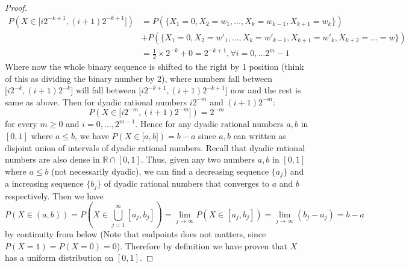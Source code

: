 \documentclass[10pt]{article}
\begin{document}
\begin{proof}
\begin{equation}
\begin{split}
P(X \in \big[i2^{-k+1}, (i+1)2^{-k+1}\big]) &= P(\{X_{1}= 0, X_{2}= w_{1},...,X_{k}= w_{k-1}, X_{k+1}= w_{k}\}) \\
& + P(\{X_{1}= 0, X_{2}= w'_{1},...,X_{k} = w'_{k-1}, X_{k+1}=w'_{k}, X_{k+2}= ... = w\}) \\
& = \frac{1}{2} \times 2^{-k} + 0= 2^{-k+1}, \forall i = 0,...2^{m}-1
\end{split}
\end{equation}
Where now the whole binary sequence is shifted to the right by 1 position (think of this as dividing the binary number by 2), where numbers fall between $\big[i2^{-k}, (i+1)2^{-k}\big]$ will fall between $\big[i2^{-k+1}, (i+1)2^{-k+1}\big]$ now and the rest is same as above.
Then for dyadic rational numbers $i2^{-m}$ and $(i+1)2^{-m}$:
$$P(X \in \big[i2^{-m}, (i+1)2^{-m}\big]) = 2^{-m}$$
for every $m\ge 0$ and $i = 0, ..., 2^{m-1}$. Hence for any dyadic rational numbers $a,b$ in $[0,1]$ where $a \le b$, we have $P(X \in \big[a, b\big]) = b-a$ since $a,b$ can written as disjoint union of intervals of dyadic rational numbers. Recall that dyadic rational numbers are also dense in $\mathbb{R}\cap[0,1]$.
Thus, given any two numbers $a,b$ in $[0,1]$ where $a \le b$ (not necessarily dyadic), we can find a decreasing sequence $\{a_{j}\}$ and a increasing sequence $\{b_{j}\}$ of dyadic rational numbers that converges to $a$ and $b$ respectively. Then we have $$P(X \in (a,b)) = P(X \in \bigcup\limits_{j=1}^{\infty}[a_{j}, b_{j}]) = \lim\limits_{j\rightarrow \infty}P(X \in[a_{j}, b_{j}]) = \lim\limits_{j\rightarrow \infty} (b_{j}- a_{j}) = b-a$$
by continuity from below (Note that endpoints does not matters, since $P(X = 1) = P(X = 0) = 0$).
Therefore by definition we have proven that $X$ has a uniform distribution on $[0,1]$.
\end{proof}
\end{document}
